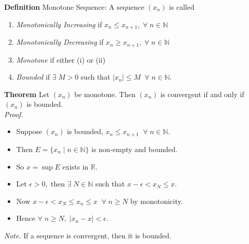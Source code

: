 \documentclass[12pt]{article}
\begin{document}
\vspace{1\baselineskip}
\begin{block}{\bf Definition} Monotone Sequence: A sequence $(x_n)$ is called
\begin{enumerate}[label=(\roman*)]
    \item {\sl Monotonically Increasing }  if $x_n\le x_{n+1},\;\forall\;n\in\mathbb{N}$
    \item {\sl Monotonically Decreasing }  if $x_n\ge x_{n+1},\;\forall\;n\in\mathbb{N}$
    \item {\sl Monotone } if either (i) or (ii)
    \item {\sl Bounded } if $\exists\;M>0$ such that $|x_n|\le M\;\;\forall\;n\in\mathbb{N}$.
\end{enumerate}

\vspace{1\baselineskip}
\begin{block}{\bf Theorem} Let $(x_n)$ be monotone. Then $(x_n)$ is convergent if and only if $(x_n)$ is bounded.\\

{\sl Proof.}
\begin{itemize}
    \item Suppose $(x_n)$ is bounded, $x_n\le x_{n+1}\;\;\forall\;n\in\mathbb{N}.$
    \item Then $E = \{x_n\;|\;n\in\mathbb{N} \}$ is non-empty and bounded.
    \item So $x=\sup E$ exists in $\mathbb{R}$.
    \item Let $\epsilon>0,$ then $\exists\;N\in\mathbb{N}$ such that $x-\epsilon<x_N\le x$.
    \item Now $x-\epsilon <x_N\le x_n\le x\;\;\forall\;n\ge N$ by monotonicity.
    \item Hence $\forall\;n\ge N,\;|x_n-x|<\epsilon.$
\end{itemize}
{\sl Note. }If a sequence is convergent, then it is bounded.
\end{block}
\end{block}
\end{document}
